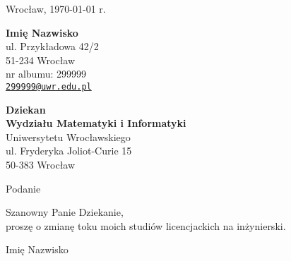 \documentclass[11pt,a4paper]{letter}
\makeatletter
\newcommand{\imieNazwisko}{Imię Nazwisko}
\newcommand{\ulica}{ul. Przykładowa 42/2}
\newcommand{\miasto}{51-234 Wrocław}
\newcommand{\nrAlbumu}{299999}
\newcommand{\email}{299999@uwr.edu.pl}
\makeatother
\begin{document}
    \pagestyle{empty}
    \begin{flushright}
        Wrocław, {\today} r.
    \end{flushright}
    \vspace{1cm}
    \begin{flushleft}
        \textbf{\imieNazwisko} \\
        \ulica\\
        \miasto\\
        nr albumu: \nrAlbumu\\
        \href{mailto:\email}{\nolinkurl{\email} }
    \end{flushleft}
    \vspace{1cm}
    \begin{flushleft}
        \hspace{80mm} \textbf{Dziekan} \\
        \hspace{80mm} \textbf{Wydziału Matematyki i Informatyki} \\
        \hspace{80mm} Uniwersytetu Wrocławskiego \\
        \hspace{80mm} ul. Fryderyka Joliot-Curie 15 \\
        \hspace{80mm} 50-383 Wrocław
    \end{flushleft}
    \vspace{1cm}
    \begin{center}
        \large {\huge Podanie}
    \end{center}
    \vspace{1cm}

    Szanowny Panie Dziekanie,\\
    proszę o zmianę toku moich studiów licencjackich na inżynierski.

    \vspace{30mm}

    \begin{flushright}
        \imieNazwisko\hspace{0.5cm} \makebox[6cm]{\hrulefill}
    \end{flushright}
\end{document}
